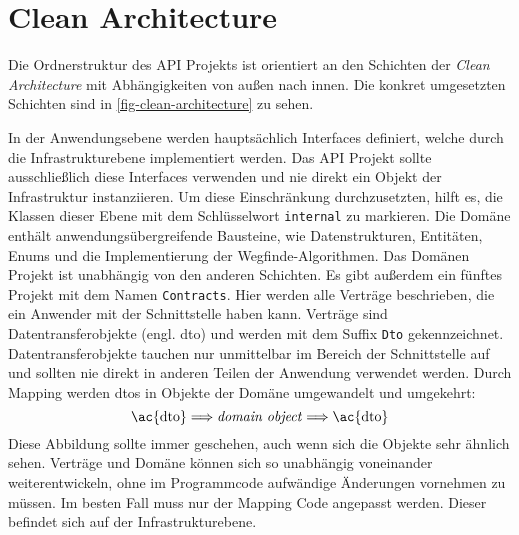 \part{Clean Architecture}
Die Ordnerstruktur des API Projekts ist orientiert an den Schichten
der \textit{Clean Architecture}
mit Abhän\-gigkeiten von außen nach innen. Die konkret umgesetzten Schichten
sind in \autoref{fig-clean-architecture} zu sehen.



\noindent
In der Anwendungsebene werden hauptsächlich Interfaces definiert, welche
durch die Infrastrukturebene implementiert werden. Das API Projekt
sollte ausschließlich diese Interfaces verwenden und nie direkt
ein Objekt der Infrastruktur instanziieren.
Um diese Einschränkung durchzusetzten, hilft es,
die Klassen dieser Ebene mit dem Schlüsselwort \texttt{internal} zu markieren.
Die Domäne enthält anwendungsübergreifende Bausteine, wie
Datenstrukturen, Entitäten, Enums und die Implementierung der Wegfinde-Algorith\-men.
Das Domänen Projekt ist unabhängig von den anderen Schichten.
Es gibt außerdem ein fünftes Projekt mit dem Namen \texttt{Contracts}. Hier
werden alle Verträge beschrieben, die ein Anwender mit der Schnittstelle
haben kann. Verträge sind Datentransferobjekte (engl. \ac{dto})
und werden mit dem Suffix \texttt{Dto} gekennzeichnet. Datentransferobjekte
tauchen nur unmittelbar im Bereich der Schnittstelle auf und
sollten nie direkt in anderen Teilen der Anwendung verwendet werden.
Durch Mapping werden \acp{dto} in Objekte der Domäne umgewandelt und umgekehrt:
\begin{equation*}
  \text{\ac{dto}} \Longrightarrow \text{\textit{domain object}} \Longrightarrow \text{\ac{dto}}
\end{equation*}
Diese Abbildung sollte immer geschehen, auch wenn sich die Objekte
sehr ähnlich sehen.
Verträge und Domäne können sich so unabhängig voneinander weiterentwickeln,
ohne im Programmcode aufwändige Änderungen vornehmen zu müssen.
Im besten Fall muss nur der Mapping Code angepasst werden.
Dieser befindet sich auf der Infrastrukturebene.